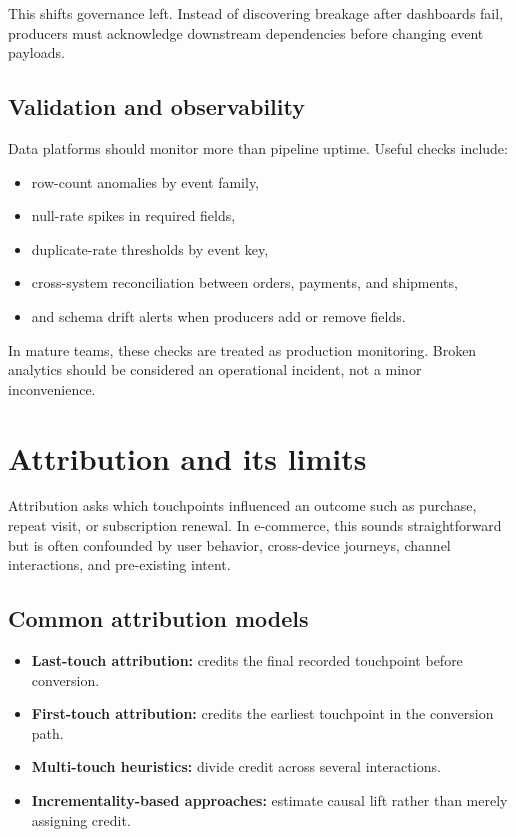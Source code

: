 This shifts governance left.
Instead of discovering breakage after dashboards fail, producers must acknowledge downstream dependencies before changing event payloads.

\subsection{Validation and observability}
Data platforms should monitor more than pipeline uptime.
Useful checks include:
\begin{itemize}
  \item row-count anomalies by event family,
  \item null-rate spikes in required fields,
  \item duplicate-rate thresholds by event key,
  \item cross-system reconciliation between orders, payments, and shipments,
  \item and schema drift alerts when producers add or remove fields.
\end{itemize}

In mature teams, these checks are treated as production monitoring.
Broken analytics should be considered an operational incident, not a minor inconvenience.

\section{Attribution and its limits}
Attribution asks which touchpoints influenced an outcome such as purchase, repeat visit, or subscription renewal.
In e-commerce, this sounds straightforward but is often confounded by user behavior, cross-device journeys, channel interactions, and pre-existing intent.

\subsection{Common attribution models}
\begin{itemize}
  \item \textbf{Last-touch attribution:} credits the final recorded touchpoint before conversion.
  \item \textbf{First-touch attribution:} credits the earliest touchpoint in the conversion path.
  \item \textbf{Multi-touch heuristics:} divide credit across several interactions.
  \item \textbf{Incrementality-based approaches:} estimate causal lift rather than merely assigning credit.
\end{itemize}

